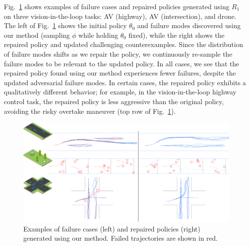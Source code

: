 Fig.~\ref{ch:corl:fig:repairs} shows examples of failure cases and repaired policies generated using $R_1$ on three vision-in-the-loop tasks: AV (highway), AV (intersection), and drone. The left of Fig.~\ref{ch:corl:fig:repairs} shows the initial policy $\theta_0$ and failure modes discovered using our method (sampling $\phi$ while holding $\theta_0$ fixed), while the right shows the repaired policy and updated challenging counterexamples. Since the distribution of failure modes shifts as we repair the policy, we continuously re-sample the failure modes to be relevant to the updated policy. In all cases, we see that the repaired policy found using our method experiences fewer failures, despite the updated adversarial failure modes. In certain cases, the repaired policy exhibits a qualitatively different behavior; for example, in the vision-in-the-loop highway control task, the repaired policy is less aggressive than the original policy, avoiding the risky overtake maneuver (top row of Fig.~\ref{ch:corl:fig:repairs}).

\begin{figure}[t]
    \centering
    \includegraphics[width=\linewidth]{images/corl/repairs.png}
    \caption{Examples of failure cases (left) and repaired policies (right) generated using our method. Failed trajectories are shown in red.}\label{ch:corl:fig:repairs}
\end{figure}

